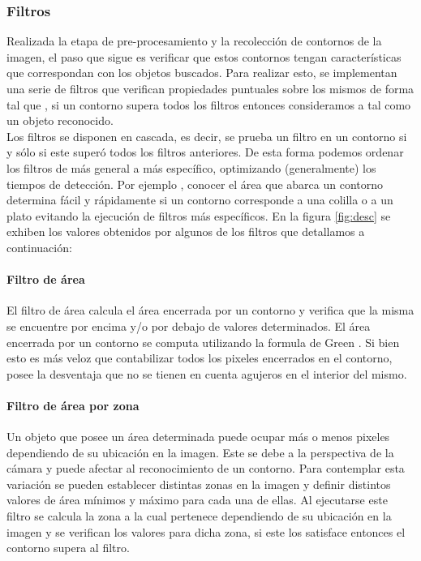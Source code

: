 	

	\subsubsection{\label{sec:filtros} Filtros}
	Realizada la etapa de pre-procesamiento y la recolección de contornos 
	de la imagen, el paso que sigue es verificar que estos
	contornos tengan características que correspondan con  los 
	objetos buscados. Para realizar esto, se implementan una serie de filtros que verifican propiedades
	puntuales sobre los mismos de forma tal que , si un contorno supera todos los filtros entonces consideramos a tal como un objeto reconocido. \\
	\indent Los filtros se disponen en cascada, es decir, se prueba un 
	filtro en un contorno si y sólo si este superó todos los filtros 
	anteriores. De esta forma podemos ordenar los filtros de más general 
	a más específico, optimizando (generalmente) los tiempos de detección. Por ejemplo , conocer 
	el área que abarca un contorno determina fácil y rápidamente si un contorno corresponde a una colilla o a un plato evitando la ejecución
	de filtros más específicos. En la figura \ref{fig:desc} se exhiben 
	los valores obtenidos por algunos de los filtros que detallamos a 
	continuación:
	\paragraph{Filtro de área}
	El filtro de área calcula el área encerrada por un contorno y verifica que la misma se encuentre por encima y/o por debajo
	de valores determinados. El área encerrada por un contorno se computa utilizando la formula de Green \cite{greenwolfram}.
	Si bien esto es más veloz que contabilizar todos los pixeles encerrados en el contorno, posee la desventaja que no se tienen en cuenta agujeros
	en el interior del mismo.
	\paragraph{Filtro de área por zona}
	Un objeto que posee un área determinada puede ocupar más o menos pixeles dependiendo de su ubicación en la imagen. Este se debe a la 
	perspectiva de la cámara y puede afectar al reconocimiento de un contorno. Para contemplar esta variación se pueden establecer distintas
	zonas en la imagen y definir distintos valores de área mínimos y máximo para cada una de ellas. Al ejecutarse este filtro se calcula la
	zona a la cual pertenece dependiendo de su ubicación en la imagen y se verifican los valores para dicha zona, si este los satisface entonces
	el contorno supera al filtro.
